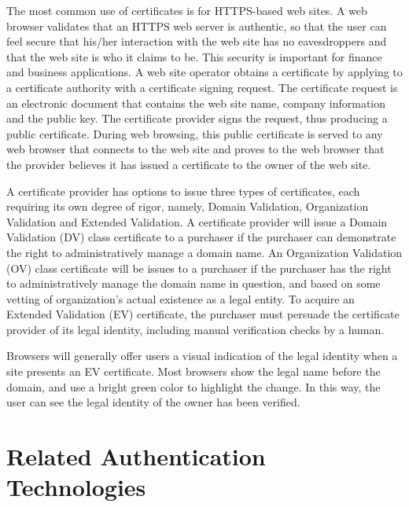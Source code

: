 \begin{multicols}{2}
The most common use of certificates is for HTTPS-based web sites. A web browser validates that an HTTPS web server is authentic, so that the user can feel secure that his/her interaction with the web site has no eavesdroppers and that the web site is who it claims to be. This security is important for finance and business applications. A web site operator obtains a certificate by applying to a certificate authority with a certificate signing request. The certificate request is an electronic document that contains the web site name, company information and the public key. The certificate provider signs the request, thus producing a public certificate. During web browsing, this public certificate is served to any web browser that connects to the web site and proves to the web browser that the provider believes it has issued a certificate to the owner of the web site.

A certificate provider has options to issue three types of certificates, each requiring its own degree of rigor, namely, Domain Validation, Organization Validation and Extended Validation. A certificate provider will issue a Domain Validation (DV) class certificate to a purchaser if the purchaser can demonstrate the right to administratively manage a domain name. An Organization Validation (OV) class certificate will be issues to a purchaser if the purchaser has the right to administratively manage the domain name in question, and based on some vetting of organization's actual existence as a legal entity. To acquire an Extended Validation (EV) certificate, the purchaser must persuade the certificate provider of its legal identity, including manual verification checks by a human.

Browsers will generally offer users a visual indication of the legal identity when a site presents an EV certificate. Most browsers show the legal name before the domain, and use a bright green color to highlight the change. In this way, the user can see the legal identity of the owner has been verified.

\section*{Related Authentication Technologies}


\end{multicols}
